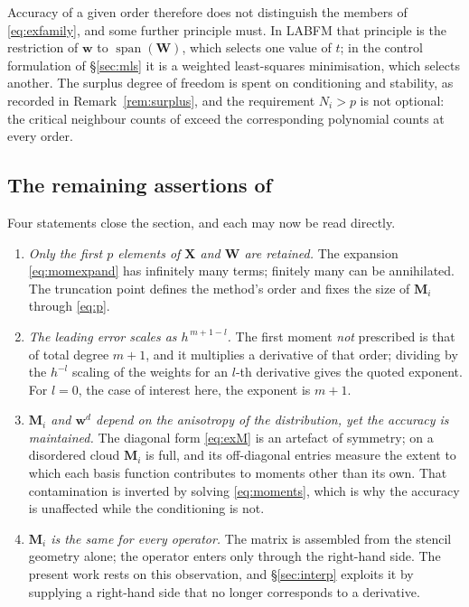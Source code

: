 \documentclass[11pt,a4paper]{article}
\begin{document}
Accuracy of a given order therefore does not distinguish the members of
\eqref{eq:exfamily}, and some further principle must. In LABFM that principle is the restriction of $\bm w$ to
$\operatorname{span}(\bm W)$, which selects one value of $t$; in the control formulation
of \S\ref{sec:mls} it is a weighted least-squares minimisation, which selects another.
The surplus degree of freedom is spent on conditioning and stability, as recorded in
Remark~\ref{rem:surplus}, and the requirement $N_i>p$ is not optional: the critical
neighbour counts of \cite[\S 3.2]{KLN2020} exceed the corresponding polynomial counts
at every order.

\subsection{The remaining assertions of \texorpdfstring{\cite[\S 3.1]{KLN2020}}{Sec. 3.1}}

Four statements close the section, and each may now be read directly.

\begin{enumerate}[label=(\roman*)]
\item \emph{Only the first $p$ elements of $\bm X$ and $\bm W$ are retained.} The
expansion \eqref{eq:momexpand} has infinitely many terms; finitely many can be
annihilated. The truncation point defines the method's order and fixes the size of
$\bm M_i$ through \eqref{eq:p}.
\item \emph{The leading error scales as $h^{\,m+1-l}$.} The first moment \emph{not}
prescribed is that of total degree $m+1$, and it multiplies a derivative of that order;
dividing by the $h^{-l}$ scaling of the weights for an $l$-th derivative gives the
quoted exponent. For $l=0$, the case of interest here, the exponent is $m+1$.
\item \emph{$\bm M_i$ and $\bm w^{d}$ depend on the anisotropy of the distribution,
yet the accuracy is maintained.} The diagonal form \eqref{eq:exM} is an artefact of
symmetry; on a disordered cloud $\bm M_i$ is full, and its off-diagonal entries measure
the extent to which each basis function contributes to moments other than its own. That
contamination is inverted by solving \eqref{eq:moments}, which is why the accuracy is
unaffected while the conditioning is not.
\item \emph{$\bm M_i$ is the same for every operator.} The matrix is assembled from the
stencil geometry alone; the operator enters only through the right-hand side. The
present work rests on this observation, and \S\ref{sec:interp} exploits it by supplying
a right-hand side that no longer corresponds to a derivative.
\end{enumerate}
\end{document}
